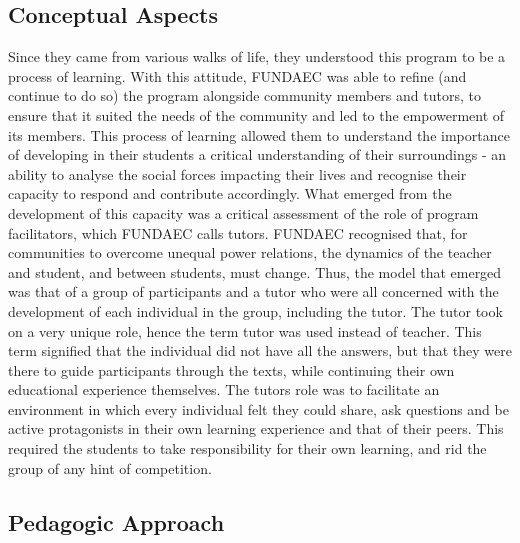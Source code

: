 \subsection{Conceptual Aspects}
Since they came from various walks of life, they understood this program to be a process of learning. With this attitude, FUNDAEC was able to refine (and continue to do so) the program alongside community members and tutors, to ensure that it suited the needs of the community and led to the empowerment of its members. This process of learning allowed them to understand the importance of developing in their students a critical understanding of their surroundings - an ability to analyse the social forces impacting their lives and recognise their capacity to respond and contribute accordingly. What emerged from the development of this capacity was a critical assessment of the role of program facilitators, which FUNDAEC calls tutors. FUNDAEC recognised that, for communities to overcome unequal power relations, the dynamics of the teacher and student, and between students, must change. Thus, the model that emerged was that of a group of participants and a tutor who were all concerned with the development of each individual in the group, including the tutor. The tutor took on a very unique role, hence the term tutor was used instead of teacher. This term signified that the individual did not have all the answers, but that they were there to guide participants through the texts, while continuing their own educational experience themselves. The tutors role was to facilitate an environment in which every individual felt they could share, ask questions and be active protagonists in their own learning experience and that of their peers. This required the students to take responsibility for their own learning, and rid the group of any hint of competition. 

\subsection{Pedagogic Approach}

